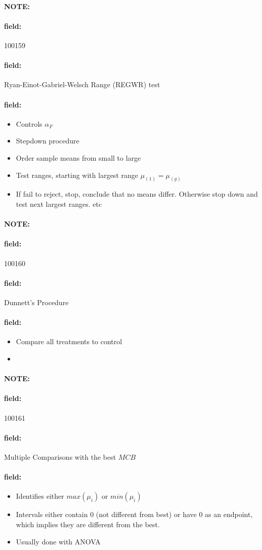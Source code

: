 \documentclass[12pt]{article}
\newenvironment{note}{\paragraph{NOTE:}}{}
\newenvironment{field}{\paragraph{field:}}{}
\begin{document}
\begin{note}
    \begin{field}
        \tiny 100159
    \end{field}
    \begin{field}
        Ryan-Einot-Gabriel-Welsch Range (REGWR) test
    \end{field}
    \begin{field}
        \begin{itemize}
          \item Controls $\alpha_F$
          \item Stepdown procedure
          \item Order sample means from small to large
          \item Test ranges, starting with largest range $\mu_{(1)} = \mu_{(g)}$
          \item If fail to reject, stop, conclude that no means differ. Otherwise stop down and test next largest ranges. etc
        \end{itemize}
    \end{field}
\end{note}

\begin{note}
    \begin{field}
        \tiny 100160
    \end{field}
    \begin{field}
        Dunnett's Procedure
    \end{field}
    \begin{field}
        \begin{itemize}
          \item Compare all treatments to control
          \item
        \end{itemize}
    \end{field}
\end{note}

\begin{note}
    \begin{field}
        \tiny 100161
    \end{field}
    \begin{field}
        Multiple Comparisons with the best $MCB$
    \end{field}
    \begin{field}
        \begin{itemize}
          \item Identifies either $max(\mu_i)$ or $min(\mu_i)$
          \item Intervals either contain 0 (not different from best) or have 0 as an endpoint, which implies they are different from the best.
          \item Usually done with ANOVA
        \end{itemize}
    \end{field}
\end{note}
\end{document}
